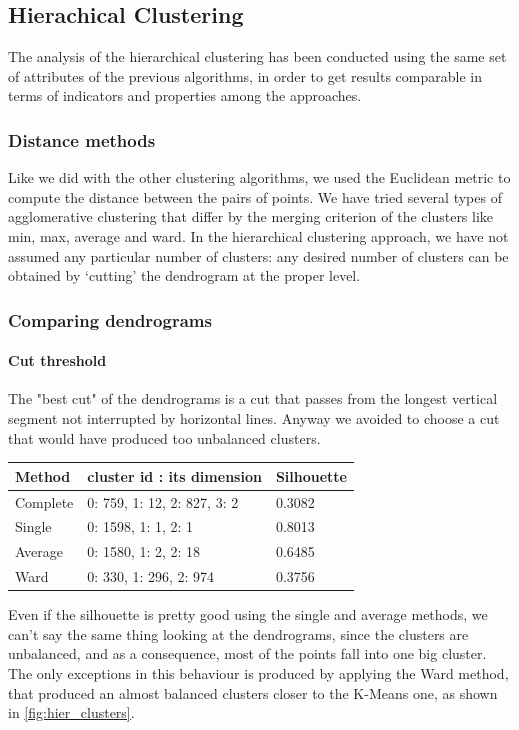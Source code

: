 \subsection{Hierachical Clustering}
The analysis of the hierarchical clustering has been conducted using the same set of attributes of the previous algorithms, in order to get results comparable in terms of indicators and properties among the approaches.

\subsubsection{Distance methods}
Like we did with the other clustering algorithms, we used the Euclidean metric to compute the distance between the pairs of points. We have tried several types of agglomerative clustering that differ by the merging criterion of the clusters like min, max, average and ward. In the hierarchical clustering approach, we have not assumed any particular number of clusters: any desired number of clusters can be obtained by ‘cutting’ the dendrogram at the proper level.

\subsubsection{Comparing dendrograms}
\paragraph{Cut threshold} The "best cut" of the dendrograms is a cut that passes from the longest vertical segment not interrupted by horizontal lines. Anyway we avoided to choose a cut that would have produced too unbalanced clusters.

\begin{table}[H]
\centering
\begin{tabular}{l|l|l}
\textbf{Method}   & \textbf{cluster id : its dimension} & \textbf{Silhouette} \\\hline
Complete & 0: 759, \hspace{2pt} 1: 12, \hspace{2pt} 2: 827, \hspace{2pt} 3: 2 & 0.3082\\
Single   & 0: 1598, 1: 1, \hspace{2pt} \hspace{2pt} 2: 1 & 0.8013 \\
Average  & 0: 1580, 1: 2, \hspace{2pt} \hspace{2pt} 2: 18 & 0.6485 \\
Ward     & 0: 330, \hspace{2pt} 1: 296, 2: 974 & 0.3756 \\\hline  
\end{tabular}
\end{table}
Even if the silhouette is pretty good using the single and average methods, we can't say the same thing looking at the dendrograms, since the clusters are unbalanced, and as a consequence, most of the points fall into one big cluster. The only exceptions in this behaviour is produced by applying the Ward method, that produced an almost balanced clusters closer to the K-Means one, as shown in \autoref{fig:hier_clusters}.

